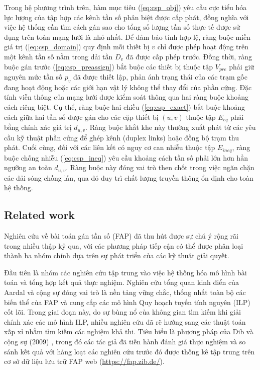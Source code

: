 \documentclass[letterpaper,journal]{IEEEtran}
\begin{document}
Trong hệ phương trình trên, hàm mục tiêu (\ref{eq:csp_obj}) yêu cầu cực tiểu hóa lực lượng của tập hợp các kênh tần số phân biệt được cấp phát, đồng nghĩa với việc hệ thống cần tìm cách gán sao cho tổng số lượng tần số thực tế được sử dụng trên toàn mạng lưới là nhỏ nhất. Để đảm bảo tính hợp lệ, ràng buộc miền giá trị (\ref{eq:csp_domain}) quy định mỗi thiết bị $v$ chỉ được phép hoạt động trên một kênh tần số nằm trong dải tần $D_v$ đã được cấp phép trước. Đồng thời, ràng buộc gán trước (\ref{eq:csp_preassign}) bắt buộc các thiết bị thuộc tập $V_{pre}$ phải giữ nguyên mức tần số $p_v$ đã được thiết lập, phản ánh trạng thái của các trạm gốc đang hoạt động hoặc các giới hạn vật lý không thể thay đổi của phần cứng. Đặc tính viễn thông của mạng lưới được kiểm soát thông qua hai ràng buộc khoảng cách riêng biệt. Cụ thể, ràng buộc hai chiều (\ref{eq:csp_exact}) bắt buộc khoảng cách giữa hai tần số được gán cho các cặp thiết bị $(u,v)$ thuộc tập $E_{eq}$ phải bằng chính xác giá trị $d_{u,v}$. Ràng buộc khắt khe này thường xuất phát từ các yêu cầu kỹ thuật phần cứng để ghép kênh (duplex links) hoặc đồng bộ trạm thu phát. Cuối cùng, đối với các liên kết có nguy cơ can nhiễu thuộc tập $E_{ineq}$, ràng buộc chống nhiễu (\ref{eq:csp_ineq}) yêu cầu khoảng cách tần số phải lớn hơn hẳn ngưỡng an toàn $d_{u,v}$. Ràng buộc này đóng vai trò then chốt trong việc ngăn chặn các dải sóng chồng lấn, qua đó duy trì chất lượng truyền thông ổn định cho toàn hệ thống.

\subsection{Related work}

Nghiên cứu về bài toán gán tần số (FAP) đã thu hút được sự chú ý rộng rãi trong nhiều thập kỷ qua, với các phương pháp tiếp cận có thể được phân loại thành ba nhóm chính dựa trên sự phát triển của các kỹ thuật giải quyết.

Đầu tiên là nhóm các nghiên cứu tập trung vào việc hệ thống hóa mô hình bài toán và tổng hợp kết quả thực nghiệm. Nghiên cứu tổng quan kinh điển của Aardal và cộng sự \cite{Aardal2007} đóng vai trò là nền tảng vững chắc, thống nhất toàn bộ các biến thể của FAP và cung cấp các mô hình Quy hoạch tuyến tính nguyên (ILP) cốt lõi. Trong giai đoạn này, do sự bùng nổ của không gian tìm kiếm khi giải chính xác các mô hình ILP, nhiều nghiên cứu đã rẽ hướng sang các thuật toán xấp xỉ nhằm tìm kiếm các nghiệm khả thi. Tiêu biểu là phương pháp của Dib và cộng sự (2009) \cite{Dib2009}, trong đó các tác giả đã tiến hành đánh giá thực nghiệm và so sánh kết quả với hàng loạt các nghiên cứu trước đó được thống kê tập trung trên cơ sở dữ liệu lưu trữ FAP web (\url{https://fap.zib.de/}).
\end{document}
